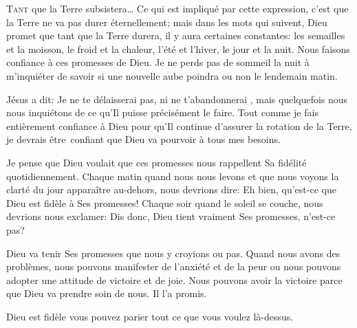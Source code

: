 



\lettrine[ante=\Og]{T}{ant} que la Terre subsistera\dots{} \Fg{} Ce qui est
 impliqué par cette expression, c'est que la Terre ne va pas durer éternellement;
 mais dans les mots qui suivent, Dieu promet que tant que la Terre durera, il y
 aura certaines constantes: les semailles et la moisson, le froid et la chaleur,
 l'été et l'hiver, le jour et la nuit. Nous faisons confiance à ces promesses de
 Dieu. Je ne perds pas de sommeil la nuit à m'inquiéter de savoir si une nouvelle
 aube poindra ou non le lendemain matin. 


Jésus a dit: 
 \Og Je ne te délaisserai pas, ni ne t'abandonnerai \Fg{}, mais
 quelquefois nous nous inquiétons de ce qu'Il puisse précisément le faire.
 Tout comme je fais entièrement confiance à Dieu pour qu'Il continue d'assurer
 la rotation de la Terre, je devrais être~confiant que Dieu va pourvoir à tous
 mes besoins.

Je pense que Dieu voulait que ces promesses nous rappellent Sa fidélité
 quotidiennement. Chaque matin quand nous nous levons et que nous voyons la
 clarté du jour apparaître au-dehors, nous devrions dire: \Og Eh bien, qu'est-ce
 que Dieu est fidèle à Ses promesses! \Fg{} Chaque soir quand le soleil se
 couche, nous devrions nous exclamer: \Og Dis donc, Dieu tient vraiment Ses
 promesses, n'est-ce pas? \Fg{}

Dieu va tenir Ses promesses que nous y croyions ou pas. Quand nous avons des
 problèmes, nous pouvons manifester de l'anxiété et de la peur ou nous pouvons
 adopter une attitude de victoire et de joie. Nous pouvons avoir la victoire
 parce que Dieu va prendre soin de nous. Il l'a promis.

Dieu est fidèle \ocadr{}vous pouvez parier tout ce que vous voulez là-dessus. 

\dvrule

